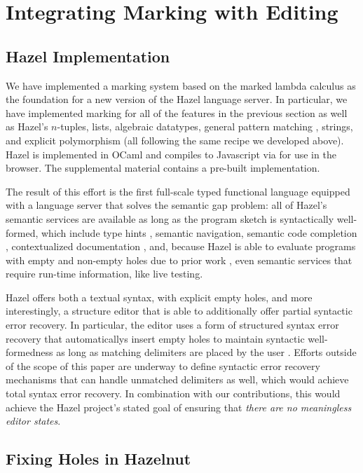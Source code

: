 \section{Integrating Marking with Editing}
\label{sec:calculus-structured-editing}
\subsection{Hazel Implementation}
\label{sec:calculus-hazel}

We have implemented a marking system based on the marked lambda calculus as the foundation for a new version of the Hazel language server. In particular, we have implemented marking for all of the features in the previous section as well as Hazel's $n$-tuples, lists, algebraic datatypes, general pattern matching \cite{oopsla23}, strings, and explicit polymorphism (all following the same recipe we developed above). Hazel is implemented in OCaml and compiles to Javascript via  \cite{jsoo} for use in the browser. The supplemental material contains a pre-built implementation.

The result of this effort is the first full-scale typed functional language equipped with a language server that solves the semantic gap problem: all of Hazel's semantic services are available as long as the program sketch is syntactically well-formed, which include type hints \cite{potter1}, semantic navigation, semantic code completion \cite{potter1,blinn}, contextualized documentation \cite{potter2}, and, because Hazel is able to evaluate programs with empty and non-empty holes due to prior work \cite{HazelnutLive}, even semantic services that require run-time information, like live testing.
% 

Hazel offers both a textual syntax, with explicit empty holes, and more interestingly,
a structure editor that is able to additionally offer partial syntactic error recovery.
In particular, the  editor uses a form of structured syntax error recovery that automaticallys insert empty holes to maintain syntactic well-formedness as long as matching delimiters are placed by the user \cite{tylr}. Efforts outside of the scope of this paper are underway to define syntactic error recovery mechanisms that can handle unmatched delimiters as well, which would achieve total syntax error recovery. In combination with our contributions, this would achieve the Hazel project's stated goal of ensuring that \emph{there are no meaningless editor states}.


\subsection{Fixing Holes in Hazelnut}
\label{sec:calculus-hazelnut}


